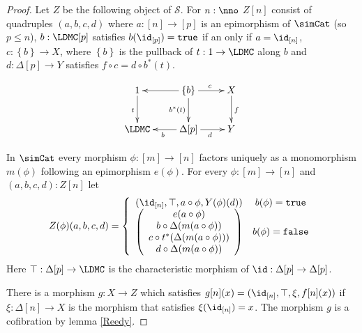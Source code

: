 \documentclass{tac}
\newcommand\cat\mathcal
\newcommand\set[1]{\left\{#1\right\}}
\newcommand\ri{^*}
\newcommand\of{:}
\newcommand\simplex\Delta
\newcommand\true{\mathtt{true}}
\newcommand\false{\mathtt{false}}
\begin{document}
\begin{proof}
Let $Z$ be the following object of $\cat S$. For $n\of\nno$ $Z[n]$ consist of quadruples $(a,b,c,d)$ where 
 $a\of[n]\to [p]$ is an epimorphism of $\simCat$ (so $p\leq n$),
 $b\of\LDMC[p]$ satisfies $b(\id_{[p]})=\true$ if an only if $a=\id_{[n]}$,
 $c\of \set{b}\to X$, where $\set{b}$ is the pullback of $t\of 1\to\LDMC$ along $b$ and 
 $d\of \simplex[p]\to Y$ satisfies $f\circ c = d\circ b\ri(t)$.

\[\xymatrix{
1\ar[d]_t & \set b\ar[l]\ar[d]_{b\ri(t)}\ar[r]^{c} & X\ar[d]^f \\
\LDMC & \simplex[p]\ar[l]^b\ar[r]_d & Y
}\]

In $\simCat$ every morphism $\phi\of [m]\to[n]$ factors uniquely as a monomorphism $m(\phi)$ following an epimorphism $e(\phi)$. For every $\phi\of [m]\to [n]$ and $(a,b,c,d)\of Z[n]$ let
\[ Z(\phi)(a,b,c,d) = \left\{\begin{array}{cc}
(\id_{[n]},\top,a\circ\phi,Y(\phi)(d)) & b(\phi)=\true \\
\left(\begin{array}{c} e(a\circ \phi)\\ b\circ \simplex(m(a\circ \phi))\\ c \circ t\ri(\simplex(m(a\circ \phi)))\\ d\circ\simplex(m(a\circ \phi))\end{array}\right) & b(\phi)=\false
\end{array}\right.
\]
Here $\top\of \simplex[p]\to\LDMC$ is the characteristic morphism of $\id\of\simplex[p]\to\simplex[p]$.

There is a morphism $g\of X\to Z$ which satisfies $g[n](x) = (\id_{[n]},\top,\xi,f[n](x))$ if $\xi\of\simplex[n] \to X$ is the morphism that satisfies $\xi(\id_{[n]})=x$. The morphism $g$ is a cofibration by lemma \ref{Reedy}.


\end{proof}
\end{document}
